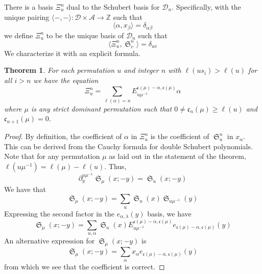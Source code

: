 \documentclass{amsart}
\newtheorem{theorem}{Theorem}[section]
\theoremstyle{definition}
\theoremstyle{remark}
\numberwithin{equation}{subsection}
\DeclareMathOperator{\sch}{\mathfrak{S}}
\newcommand{\dsch}{\ensuremath{\Xi}}
\newcommand{\coma}{\mathcal{A}}
\newcommand{\dcoma}{\mathcal{D}}
\newcommand{\code}{\mathfrak{c}}
\begin{document}
There is a basis $\dsch_u^{n}$ dual to the Schubert basis for $\dcoma_n$. Specifically, with the unique pairing $\langle -,-\rangle:\dcoma\times \coma\to\mathbb{Z}$ such that
$$\langle \alpha,x_\beta\rangle = \delta_{\alpha\beta}$$
we define $\dsch_u^n$ to be the unique basis of $\dcoma_n$ such that
$$\langle \dsch_u^n,\sch_v^n\rangle = \delta_{uv}$$
We characterize it with an explicit formula.

\begin{theorem}
	For each permutation $u$ and integer $n$ with $\ell(us_i)>\ell(u)$ for all $i>n$ we have the equation
	$$\dsch_u^{n} = \sum_{\ell(\alpha)=n} E^{\code(\mu)-\alpha,\code(\mu)}_{u\mu^{-1}}\alpha$$
	where $\mu$ is any strict dominant permutation such that $0\neq \code_n(\mu) \geq \ell(u)$ and $\code_{n+1}(\mu)=0$.
\end{theorem}
\begin{proof}
	By definition, the coefficient of $\alpha$ in $\dsch_u^n$ is the coefficient of $\sch_u^n$ in $x_\alpha$. This can be derived from the Cauchy formula for double Schubert polynomials. Note that for any permutation $\mu$ as laid out in the statement of the theorem, $\ell(u\mu^{-1})=\ell(\mu)-\ell(u)$. Thus,
	$$\partial_y^{u\mu^{-1}}\sch_\mu(x;-y) = \sch_u(x;-y)$$
	We have that
	$$\sch_\mu(x;-y)=\sum_u \sch_u(x)\sch_{u\mu^{-1}}(y)$$
	Expressing the second factor in the $e_{\alpha,\lambda}(y)$ basis, we have
	$$\sch_\mu(x;-y)=\sum_{u,\alpha} \sch_u(x)E_{u\mu^{-1}}^{\code(\mu)-\alpha,\code(\mu)}e_{\code(\mu)-\alpha,\code(\mu)}(y)$$
	An alternative expression for $\sch_\mu(x;-y)$ is
	$$\sch_\mu(x;-y)=\sum_{\alpha} x_\alpha e_{\code(\mu)-\alpha,\code(\mu)}(y)$$
	from which we see that the coefficient is correct.
\end{proof}

\end{document}
